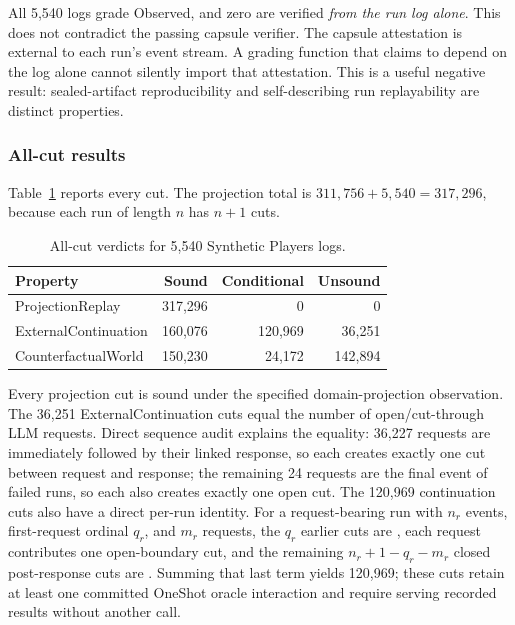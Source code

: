 All 5,540 logs grade Observed, and zero are verified \emph{from the run log
alone}.  This does not contradict the passing capsule verifier.  The capsule
attestation is external to each run's event stream.  A grading function that
claims to depend on the log alone cannot silently import that attestation.
This is a useful negative result: sealed-artifact reproducibility and
self-describing run replayability are distinct properties.

\subsubsection{All-cut results}

Table~\ref{tab:syntheticcuts} reports every cut.  The projection total is
$311{,}756 + 5{,}540 = 317{,}296$, because each run of length $n$ has $n+1$
cuts.

\begin{table}[ht]
\centering
\small
\begin{tabular}{@{}lrrr@{}}
\toprule
Property & Sound & Conditional & Unsound \\
\midrule
ProjectionReplay & 317,296 & 0 & 0 \\
ExternalContinuation & 160,076 & 120,969 & 36,251 \\
CounterfactualWorld & 150,230 & 24,172 & 142,894 \\
\bottomrule
\end{tabular}
\caption{All-cut verdicts for 5,540 Synthetic Players logs.}
\label{tab:syntheticcuts}
\end{table}

Every projection cut is sound under the specified domain-projection
observation.  The 36,251 ExternalContinuation  cuts equal the number of
open/cut-through LLM requests.  Direct sequence audit explains the equality:
36,227 requests are immediately followed by their linked response, so each
creates exactly one cut between request and response; the remaining 24 requests
are the final event of failed runs, so each also creates exactly one open cut.
The 120,969  continuation cuts also have a direct per-run
identity.  For a request-bearing run with $n_r$ events, first-request ordinal
$q_r$, and $m_r$ requests, the $q_r$ earlier cuts are , each request
contributes one open-boundary  cut, and the remaining
$n_r+1-q_r-m_r$ closed post-response cuts are .  Summing that
last term yields 120,969; these cuts retain at least one committed OneShot oracle
interaction and require serving recorded results without another call.

